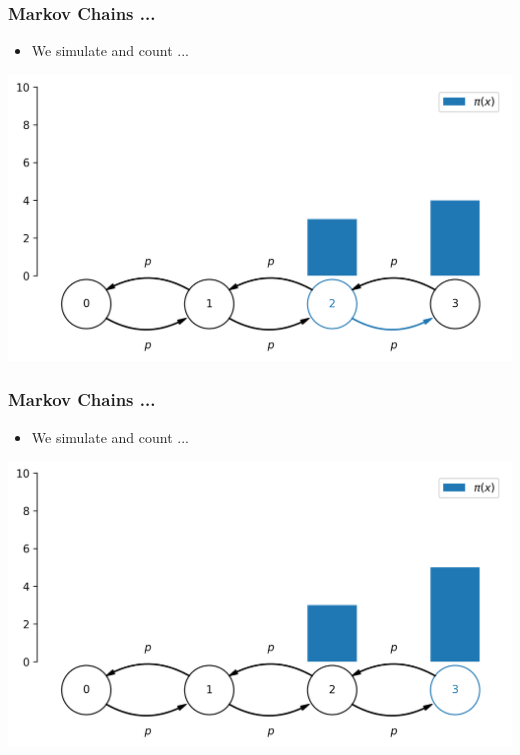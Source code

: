 \begin{frame}[c]
    \frametitle{Markov Chains ...}
    \begin{itemize}
        \item We simulate and count ...
    \end{itemize}
    \begin{center}
        \includegraphics[scale=0.6]{imgs/simulation6.png}
    \end{center}
\end{frame}

\begin{frame}[c]
    \frametitle{Markov Chains ...}
    \begin{itemize}
        \item We simulate and count ...
    \end{itemize}
    \begin{center}
        \includegraphics[scale=0.6]{imgs/simulation7.png}
    \end{center}
\end{frame}


